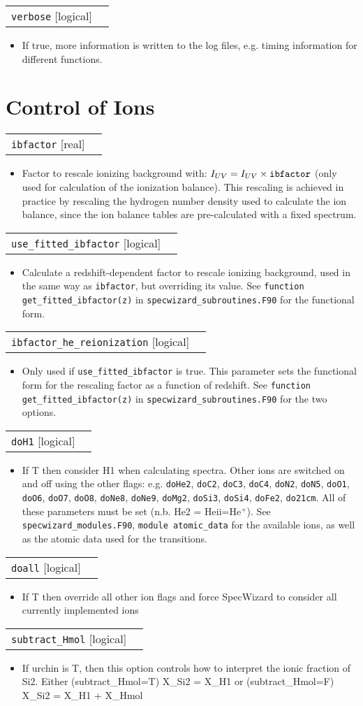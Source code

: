 \documentclass{report}
\makeatletter
\newcommand{\paramdefinition}[3]{
\begin{tabular*}{\textwidth}{l@{\extracolsep{\fill}}r}
		{\tt #1} [{\sc #2}]& #3 \\
\end{tabular*}}
\newcommand{\paramdescription}[1]{
\begin{itemize}
\item #1
\end{itemize}\vspace{0.2cm}}
\newcommand{\param}[1]{{\tt #1}}
\makeatother
\begin{document}
\paramdefinition{verbose}{logical}{ }
\paramdescription{If true, more information is written to the log files, e.g. timing information for different functions.}


\section{Control of Ions}

\paramdefinition{ibfactor}{real}{}
\paramdescription{Factor to rescale ionizing background with: $I_{UV} = I_{UV}\times{\tt ibfactor}$ (only used for calculation of the ionization balance). This rescaling is achieved in practice by rescaling the hydrogen number density used to calculate the ion balance, since the ion balance tables are pre-calculated with a fixed spectrum.}

\paramdefinition{use\_fitted\_ibfactor}{logical}{}
\paramdescription{Calculate a redshift-dependent factor to rescale ionizing background, used in the same way as \param{ibfactor}, but overriding its value. See \param{function get\_fitted\_ibfactor(z)} in \param{specwizard\_subroutines.F90} for the functional form.}

\paramdefinition{ibfactor\_he\_reionization}{logical}{}
\paramdescription{Only used if \param{use\_fitted\_ibfactor} is true. This parameter sets the functional form for the rescaling factor as a function of redshift. See \param{function get\_fitted\_ibfactor(z)} in \param{specwizard\_subroutines.F90} for the two options.}

\paramdefinition{doH1}{logical}{}
\paramdescription{If T then consider H1 when calculating spectra.  Other ions are switched on and off using the other flags: e.g. {\tt doHe2}, {\tt doC2}, {\tt doC3}, {\tt doC4}, {\tt doN2}, {\tt doN5}, {\tt doO1}, {\tt doO6}, {\tt doO7}, {\tt doO8}, {\tt doNe8}, {\tt doNe9}, {\tt doMg2}, {\tt doSi3}, {\tt doSi4}, {\tt doFe2}, {\tt do21cm}.  All of these parameters must be set (n.b. He2 = He{\sc ii}=He$^+$). See \param{specwizard\_modules.F90}, \param{module atomic\_data} for the available ions, as well as the atomic data used for the transitions.}

\paramdefinition{doall}{logical}{}
\paramdescription{If T then override all other ion flags and force SpecWizard to consider all currently implemented ions}

\paramdefinition{subtract\_Hmol}{logical}{}
\paramdescription{If urchin is T, then this option controls how to interpret the ionic fraction of Si2. Either (subtract\_Hmol=T) X\_Si2 = X\_H1 or (subtract\_Hmol=F) X\_Si2 = X\_H1 + X\_Hmol}
\end{document}
